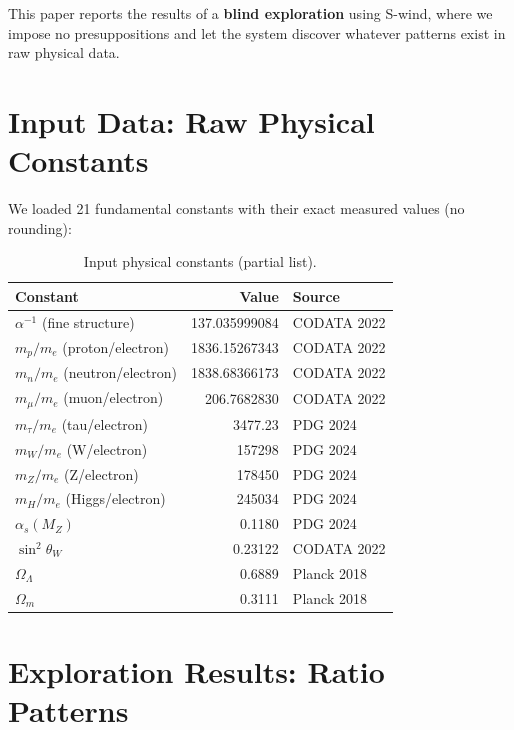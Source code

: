 \documentclass[11pt,a4paper]{article}
\begin{document}
This paper reports the results of a \textbf{blind exploration} using S-wind, where we impose no presuppositions and let the system discover whatever patterns exist in raw physical data.

\section{Input Data: Raw Physical Constants}

We loaded 21 fundamental constants with their exact measured values (no rounding):

\begin{table}[h]
\centering
\begin{tabular}{|l|r|l|}
\hline
Constant & Value & Source \\
\hline
$\alpha^{-1}$ (fine structure) & 137.035999084 & CODATA 2022 \\
$m_p/m_e$ (proton/electron) & 1836.15267343 & CODATA 2022 \\
$m_n/m_e$ (neutron/electron) & 1838.68366173 & CODATA 2022 \\
$m_\mu/m_e$ (muon/electron) & 206.7682830 & CODATA 2022 \\
$m_\tau/m_e$ (tau/electron) & 3477.23 & PDG 2024 \\
$m_W/m_e$ (W/electron) & 157298 & PDG 2024 \\
$m_Z/m_e$ (Z/electron) & 178450 & PDG 2024 \\
$m_H/m_e$ (Higgs/electron) & 245034 & PDG 2024 \\
$\alpha_s(M_Z)$ & 0.1180 & PDG 2024 \\
$\sin^2\theta_W$ & 0.23122 & CODATA 2022 \\
$\Omega_\Lambda$ & 0.6889 & Planck 2018 \\
$\Omega_m$ & 0.3111 & Planck 2018 \\
\hline
\end{tabular}
\caption{Input physical constants (partial list).}
\end{table}

\section{Exploration Results: Ratio Patterns}
\end{document}
